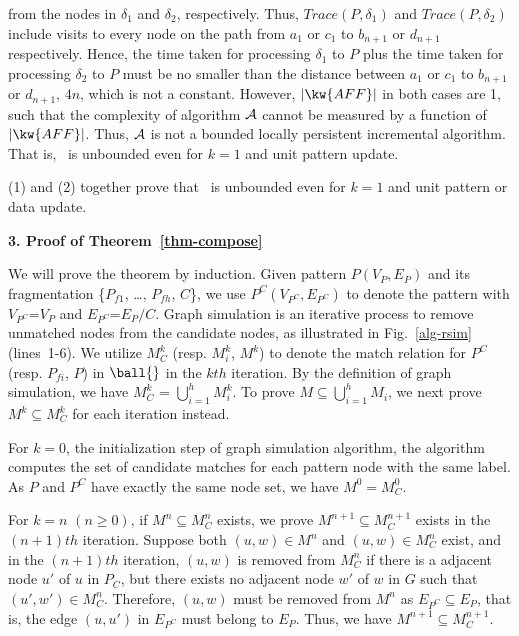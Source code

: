 from the nodes in $\delta_1$ and $\delta_2$, respectively.
Thus, $Trace(P, \delta_1)$ and $Trace(P, \delta_2)$ include visits to every node on the path from $a_1$ or $c_1$ to $b_{n+1}$ or $d_{n+1}$ respectively.
Hence, the time taken for processing $\delta_1$ to $P$ plus the time taken for processing $\delta_2$ to $P$ must be no smaller than the distance between $a_1$ or $c_1$ to $b_{n+1}$ or $d_{n+1}$, \ie $4n$, which is not a constant.
However, $|\kw{AFF}|$ in both cases are 1, such that the complexity of algorithm ${\cal A}$ cannot be measured by a function of $|\kw{AFF}|$.
Thus, ${\cal A}$ is not a bounded locally persistent incremental algorithm.
That is, \dynteamF\, is unbounded even for $k=1$ and unit pattern update.

\vspace{-1.5ex}
(1) and (2) together prove that \dynteamF\, is unbounded even for $k=1$ and unit pattern or data update.

\noindent
{\textbf{3. Proof of Theorem~\ref{thm-compose}}}

We will prove the theorem by induction.
Given pattern $P(V_P,E_P)$ and its fragmentation \{${P}_{f1}$, \ldots, ${P}_{fh}$, $C$\},
we use $P^{C}(V_{P^{C}},E_{P^{C}})$ to denote the pattern with $V_{P^{C}}$=$V_P$ and $E_{P^{C}}$=$E_P/C$.
Graph simulation is an iterative process to remove unmatched nodes from the candidate nodes,
as illustrated in Fig.~\ref{alg-rsim} (lines~1-6).
We utilize $M_{C}^{k}$ (resp. $M_{i}^{k}$, $M^{k}$) to denote the match relation for $P^{C}$ (resp. $P_{fi}$, $P$) in $\ball{}$ in the $kth$ iteration.
By the definition of graph simulation, we have $M_{C}^{k}$ = $\bigcup_{i=1}^{h}M_{i}^{k}$.
To prove $M\subseteq\bigcup_{i=1}^{h}M_{i}$,
we next prove $M^{k}\subseteq M_{C}^{k}$ for each iteration instead.

\vspace{-1.8ex}
 For $k=0$, \ie the initialization step of graph simulation algorithm,
the algorithm computes the set of candidate matches for each pattern node with the same label.
As $P$ and $P^{C}$ have exactly the same node set, we have $M^{0}= M_{C}^{0}$.

\vspace{-1.8ex}
 For $k=n$ $(n\geq 0)$, if $M^{n}\subseteq M_{C}^{n}$ exists, we prove $M^{n+1}\subseteq M_{C}^{n+1}$ exists in the $(n+1)th$ iteration.
Suppose both $(u,w)\in M^{n}$ and $(u,w)\in M_{C}^{n}$ exist,
and in the $(n+1)th$ iteration, $(u,w)$ is removed from $M_{C}^{n}$ if there is a adjacent node $u'$ of $u$ in $P_{C}$,
but there exists no adjacent node $w'$ of $w$ in $G$ such that $(u',w')\in M_{C}^{n}$.
Therefore, $(u,w)$ must be removed from $M^{n}$ as $E_{P^{C}} \subseteq E_{P}$,
that is, the edge $(u,u')$ in $E_{P^{C}}$ must belong to $E_{P}$.
Thus, we have $M^{n+1}\subseteq M_{C}^{n+1}$.

